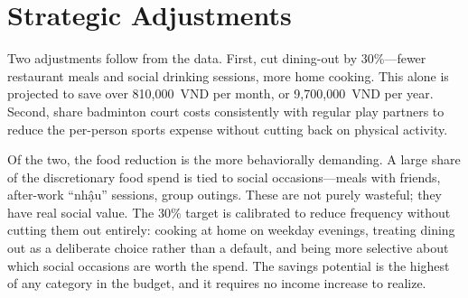 \section{Strategic Adjustments}

Two adjustments follow from the data. First, cut dining-out by 30\%---fewer restaurant meals and social drinking sessions, more home cooking. This alone is projected to save over 810,000~VND per month, or 9,700,000~VND per year. Second, share badminton court costs consistently with regular play partners to reduce the per-person sports expense without cutting back on physical activity.

Of the two, the food reduction is the more behaviorally demanding. A large share of the discretionary food spend is tied to social occasions---meals with friends, after-work ``nhậu'' sessions, group outings. These are not purely wasteful; they have real social value. The 30\% target is calibrated to reduce frequency without cutting them out entirely: cooking at home on weekday evenings, treating dining out as a deliberate choice rather than a default, and being more selective about which social occasions are worth the spend. The savings potential is the highest of any category in the budget, and it requires no income increase to realize.
